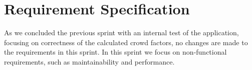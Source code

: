 \section{Requirement Specification} \label{sec:s4_reqs}
As we concluded the previous sprint with an internal test of the application, focusing on correctness of the calculated crowd factors, no changes are made to the requirements in this sprint. In this sprint we focus on non-functional requirements, such as maintainability and performance. 






